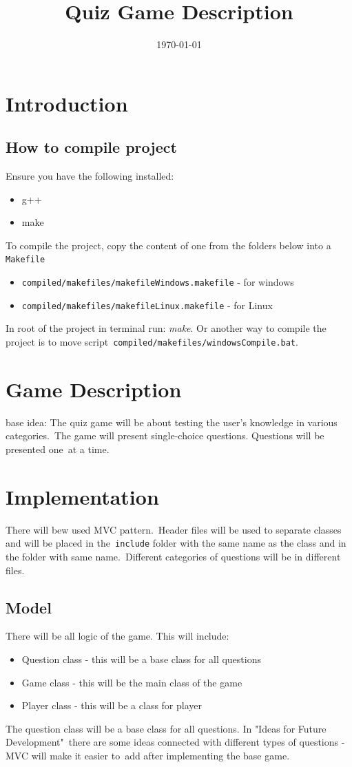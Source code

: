 \documentclass[a4paper,12pt]{article}
\title{Quiz Game Description}
\date{\today}
\begin{document}
\maketitle

\section{Introduction}
\subsection{How to compile project}
Ensure you have the following installed:
\begin{itemize}
    \item g++
    \item make
\end{itemize}

To compile the project, copy the content of one from the folders below into a \texttt{Makefile}
\begin{itemize}
    \item \texttt{compiled/makefiles/makefileWindows.makefile} - for windows
    \item \texttt{compiled/makefiles/makefileLinux.makefile} - for Linux
\end{itemize}
In root of the project in terminal run: \textit{make}. \newline
Or another way to compile the project is to move script\
\texttt{compiled/makefiles/windowsCompile.bat}.

\section{Game Description}
base idea:
The quiz game will be about testing the user's knowledge in various categories.\
The game will present single-choice questions. Questions will be presented one\
at a time.

\section{Implementation}
There will bew used MVC pattern.\
Header files will be used to separate classes and will be placed in the\
\texttt{include} folder with the same name as the class and in the folder with same name.\
Different categories of questions will be in different files.
\subsection{Model}
There will be all logic of the game. This will include:
\begin{itemize}
    \item Question class - this will be a base class for all questions
    \item Game class - this will be the main class of the game
    \item Player class - this will be a class for player
\end{itemize}
The question class will be a base class for all questions. In "Ideas for Future Development"\
there are some ideas connected with different types of questions - MVC will make it easier to\
add after implementing the base game.
\end{document}
